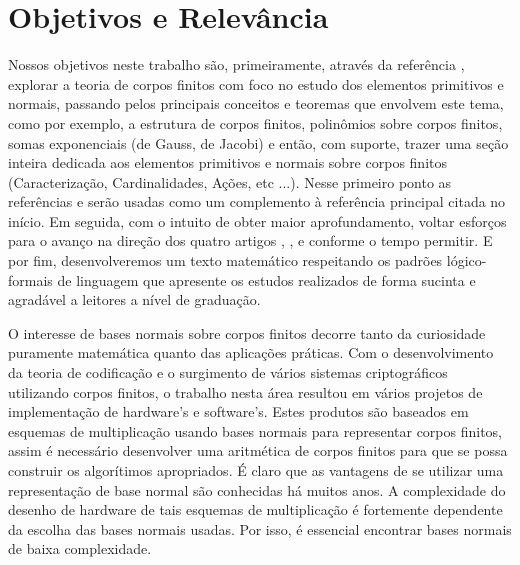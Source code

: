 \documentclass[12pt,twoside]{article}
\begin{document}
  \section{Objetivos e Relevância}
    Nossos objetivos neste trabalho são, primeiramente, através da referência \cite[Finite fields]{finite-fields-1997}, 
    explorar a teoria de corpos finitos com foco no estudo dos elementos primitivos e normais, passando
    pelos principais conceitos e teoremas que envolvem este tema, como por exemplo, a
    estrutura de corpos finitos, polinômios sobre corpos finitos, somas exponenciais (de
    Gauss, de Jacobi) e então, com suporte, trazer uma seção inteira dedicada aos
    elementos primitivos e normais sobre corpos finitos (Caracterização, Cardinalidades,
    Ações, etc ...). Nesse primeiro ponto as referências \cite[Tópicos de álgebra]{topicos-de-algebra-1970} 
    e \cite[Abstract algebra]{abstract-algebra-2007} serão usadas como um complemento à referência principal citada no início.
    Em seguida, com o intuito de obter maior aprofundamento, voltar esforços para o avanço na direção dos quatro 
    artigos \cite[Primitive normal bases for finite fields]{article-1987}, 
    \cite[Pairs of primitive elements in fields of even order]{article-2014},
    \cite[Existence of some special primitive normal elements over finite fields]{article-2017} e 
    \cite[On primitive normal elements over finite fields]{article-2018} conforme o tempo permitir.
    E por fim, desenvolveremos um texto matemático respeitando os padrões lógico-formais de linguagem que apresente 
    os estudos realizados de forma sucinta e agradável a leitores a nível de graduação.

    O interesse de bases normais sobre corpos finitos decorre tanto da
    curiosidade puramente matemática quanto das aplicações práticas. Com o
    desenvolvimento da teoria de codificação e o surgimento de vários sistemas
    criptográficos utilizando corpos finitos, o trabalho nesta área resultou em vários
    projetos de implementação de hardware's e software's. Estes produtos são
    baseados em esquemas de multiplicação usando bases normais para representar
    corpos finitos, assim é necessário desenvolver uma aritmética de corpos finitos para
    que se possa construir os algorítimos apropriados. É claro que as vantagens de se
    utilizar uma representação de base normal são conhecidas há muitos anos. A
    complexidade do desenho de hardware de tais esquemas de multiplicação é
    fortemente dependente da escolha das bases normais usadas. Por isso, é essencial
    encontrar bases normais de baixa complexidade. \\
    
    \newpage %

  \thispagestyle{empty} %
\end{document}
